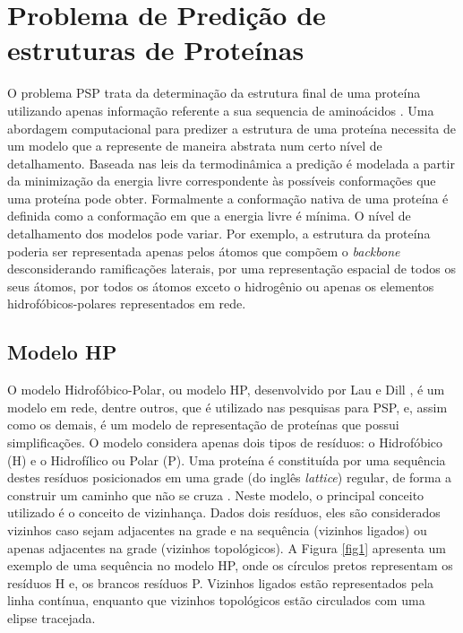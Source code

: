 \documentclass[conference]{IEEEtran}
\begin{document}
\section{Problema de Predição de estruturas de Proteínas}
O problema PSP trata da determinação da estrutura final de uma proteína utilizando apenas informação referente a sua sequencia de aminoácidos \cite{dorn2014three}. Uma abordagem computacional para predizer a estrutura de uma proteína necessita de um modelo que a represente de maneira abstrata num certo nível de detalhamento. Baseada nas leis da termodinâmica a predição é modelada a partir da minimização da energia livre correspondente às possíveis conformações que uma proteína pode obter. Formalmente a conformação nativa de uma proteína é definida como a conformação em que a energia livre é mínima. O nível de detalhamento dos modelos pode variar. Por exemplo, a estrutura da proteína poderia ser representada apenas pelos átomos que compõem o \textit{backbone} desconsiderando ramificações laterais, por uma representação espacial de todos os seus átomos, por todos os átomos exceto o hidrogênio ou apenas os elementos hidrofóbicos-polares representados em rede\cite{lopes2008evolutionary}.


\subsection{Modelo HP}
O modelo Hidrofóbico-Polar, ou modelo HP, desenvolvido por Lau e Dill  \cite{lau1989lattice}, é um modelo em rede, dentre outros, que é utilizado nas pesquisas para PSP, e, assim como os demais, é um modelo de representação de proteínas que possui simplificações. O modelo considera apenas dois tipos de resíduos: o Hidrofóbico (H) e o Hidrofílico ou Polar (P). Uma proteína é constituída por uma sequência destes resíduos posicionados em uma grade (do inglês \textit{lattice}) regular, de forma a construir um caminho que não se cruza \cite{santana2008protein}. Neste modelo, o principal conceito utilizado é o conceito de vizinhança. Dados dois resíduos, eles são considerados vizinhos caso sejam adjacentes na grade e na sequência (vizinhos ligados) ou apenas adjacentes na grade (vizinhos topológicos). A Figura \ref{fig1} apresenta um exemplo de uma sequência no modelo HP, onde os círculos pretos representam os resíduos H e, os brancos resíduos P. Vizinhos ligados estão representados pela linha contínua, enquanto que vizinhos topológicos estão circulados com uma elipse tracejada.
\end{document}
